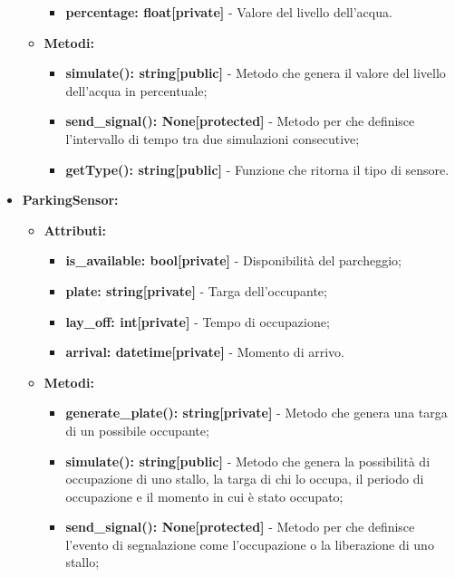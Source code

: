 \documentclass[8pt]{article}
\begin{document}
\begin{itemize}
\begin{itemize}
        \begin{itemize}
	\setlength\itemsep{0em}
            \item \textbf{percentage: float[private]} - Valore del livello dell'acqua.
        \end{itemize}
        \item \textbf{Metodi:}
        \begin{itemize}
	\setlength\itemsep{0em}
            \item \textbf{simulate(): string[public]} - Metodo che genera il valore del livello dell'acqua in percentuale;
            \item \textbf{send\_signal(): None[protected]} - Metodo per che definisce l'intervallo di tempo tra due simulazioni consecutive;
            \item \textbf{getType(): string[public]} - Funzione che ritorna il tipo di sensore.
        \end{itemize}
    \end{itemize}
    \item \textbf{ParkingSensor:}
    \begin{itemize}
	\setlength\itemsep{0em}
        \item \textbf{Attributi:}
        \begin{itemize}
	\setlength\itemsep{0em}
            \item \textbf{is\_available: bool[private]} - Disponibilità del parcheggio;
            \item \textbf{plate: string[private]} - Targa dell'occupante;
            \item \textbf{lay\_off: int[private]} - Tempo di occupazione;
            \item \textbf{arrival: datetime[private]} - Momento di arrivo.
        \end{itemize}
        \item \textbf{Metodi:}
        \begin{itemize}
	\setlength\itemsep{0em}
            \item \textbf{generate\_plate(): string[private]} - Metodo che genera una targa di un possibile occupante;
            \item \textbf{simulate(): string[public]} - Metodo che genera la possibilità di occupazione di uno stallo, la targa di chi lo occupa, il periodo di occupazione e il momento in cui è stato occupato;
            \item \textbf{send\_signal(): None[protected]} - Metodo per che definisce l'evento di segnalazione come l'occupazione o la liberazione di uno stallo;

\end{itemize}
\end{itemize}
\end{itemize}
\end{document}
